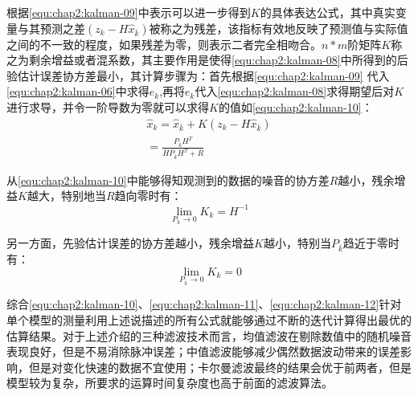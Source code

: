 \par 根据\ref{equ:chap2:kalman-09}中表示可以进一步得到$K$的具体表达公式，其中真实变量与其预测之差$(z_{k}-H\hat{x}_{\bar{k}})$被称之为残差，该指标有效地反映了预测值与实际值之间的不一致的程度，如果残差为零，则表示二者完全相吻合。$n*m$阶矩阵$K$称之为剩余增益或者混系数，其主要作用是使得\ref{equ:chap2:kalman-08}中所得到的后验估计误差协方差最小，其计算步骤为：首先根据\ref{equ:chap2:kalman-09} 代入\ref{equ:chap2:kalman-06}中求得$e_{k}$,再将$e_{k}$代入\ref{equ:chap2:kalman-08}求得期望后对$K$进行求导，并令一阶导数为零就可以求得$K$的值如\ref{equ:chap2:kalman-10}：
\begin{align}
\label{equ:chap2:kalman-10}
\hat{x}_{k}=\hat{x}_{\bar{k}} + K(z_{k}-H\hat{x}_{\bar{k}})
\nonumber \\
=\frac{P_{\bar{k}}H^{T}}{HP_{\bar{k}}H^{T}+R}
\end{align}
\par 从\ref{equ:chap2:kalman-10}中能够得知观测到的数据的噪音的协方差$R$越小，残余增益$K$越大，特别地当$R$趋向零时有：
\begin{equation}
\label{equ:chap2:kalman-11}
\lim_{P_{k} \to 0 }K_{k}=H^{-1}
\end{equation}
\par 另一方面，先验估计误差的协方差越小，残余增益$K$越小，特别当$P_{\bar{k}}$趋近于零时有：
\begin{equation}
\label{equ:chap2:kalman-12}
\lim_{P_{\bar{k}} \to 0 }K_{k}=0
\end{equation}
\par 综合\ref{equ:chap2:kalman-10}、\ref{equ:chap2:kalman-11}、\ref{equ:chap2:kalman-12}针对单个模型的测量利用上述说描述的所有公式就能够通过不断的迭代计算得出最优的估算结果。对于上述介绍的三种滤波技术而言，均值滤波在剔除数值中的随机噪音表现良好，但是不易消除脉冲误差；中值滤波能够减少偶然数据波动带来的误差影响，但是对变化快速的数据不宜使用；卡尔曼滤波最终的结果会优于前两者，但是模型较为复杂，所要求的运算时间复杂度也高于前面的滤波算法。
